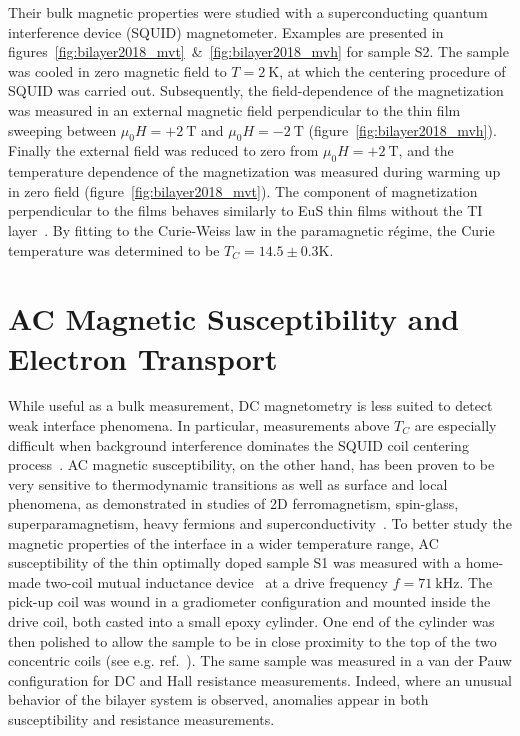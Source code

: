 %
%
%
Their bulk magnetic properties were studied with a superconducting quantum interference device (SQUID) magnetometer. Examples are presented in figures~\ref{fig:bilayer2018_mvt}~\&~\ref{fig:bilayer2018_mvh} for sample S2. The sample was cooled in zero magnetic field to $T=2~\mathrm{K}$, at which the centering procedure of SQUID was carried out. Subsequently, the field-dependence of the magnetization was measured in an external magnetic field perpendicular to the thin film sweeping between $\mu_0H = +2~\mathrm{T}$ and $\mu_0H = -2~\mathrm{T}$ (figure~\ref{fig:bilayer2018_mvh}). Finally the external field was reduced to zero from $\mu_0H = +2~\mathrm{T}$, and the temperature dependence of the magnetization was measured during warming up in zero field (figure~\ref{fig:bilayer2018_mvt}). The component of magnetization perpendicular to the films behaves similarly to EuS thin films without the TI layer~\cite{EuS_PLD}. By fitting to the Curie-Weiss law in the paramagnetic r\'egime, the Curie temperature was determined to be $T_C = 14.5\pm0.3\mathrm{K}$.

\section{AC Magnetic Susceptibility and Electron Transport}
While useful as a bulk measurement, DC magnetometry is less suited to detect weak interface phenomena. In particular, measurements above $T_C$ are especially difficult when background interference dominates the SQUID coil centering process~\cite{squid_center_error}. AC magnetic susceptibility, on the other hand, has been proven to be very sensitive to thermodynamic transitions as well as surface and local phenomena, as demonstrated in studies of 2D ferromagnetism, spin-glass, superparamagnetism, heavy fermions and superconductivity~\cite{ac_nitroxide, ac_spin_glass, ac_superpara, Ando1994, Gegenwart2005, Schemm2014}. To better study the magnetic properties of the interface in a wider temperature range, AC susceptibility of the thin optimally doped sample S1 was measured with a home-made two-coil mutual inductance device~\cite{Jeanneret1989,Yazdani1993} at a drive frequency $f=71~\mathrm{kHz}$. The pick-up coil was wound in a gradiometer configuration and mounted inside the drive coil, both casted into a small epoxy cylinder. One end of the cylinder was then polished to allow the sample to be in close proximity to the top of the two concentric coils (see e.g. ref.~\cite{YazdaniThesis}). The same sample was measured in a van der Pauw configuration for DC and Hall resistance measurements. Indeed, where an unusual behavior of the bilayer system is observed, anomalies appear in both susceptibility and resistance measurements.

